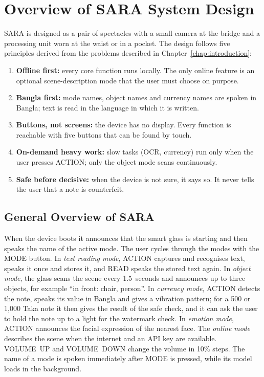 \section{Overview of SARA System Design}
\label{sec:overview}

SARA is designed as a pair of spectacles with a small camera at the bridge and a processing unit worn at the waist or in a pocket. The design follows five principles derived from the problems described in Chapter~\ref{chap:introduction}:

\begin{enumerate}[noitemsep]
    \item \textbf{Offline first:} every core function runs locally. The only online feature is an optional scene-description mode that the user must choose on purpose.
    \item \textbf{Bangla first:} mode names, object names and currency names are spoken in Bangla; text is read in the language in which it is written.
    \item \textbf{Buttons, not screens:} the device has no display. Every function is reachable with five buttons that can be found by touch.
    \item \textbf{On-demand heavy work:} slow tasks (OCR, currency) run only when the user presses ACTION; only the object mode scans continuously.
    \item \textbf{Safe before decisive:} when the device is not sure, it says so. It never tells the user that a note is counterfeit.
\end{enumerate}

\subsection{General Overview of SARA}
When the device boots it announces that the smart glass is starting and then speaks the name of the active mode. The user cycles through the modes with the MODE button. In \textit{text reading mode}, ACTION captures and recognises text, speaks it once and stores it, and READ speaks the stored text again. In \textit{object mode}, the glass scans the scene every 1.5~seconds and announces up to three objects, for example ``in front: chair, person''. In \textit{currency mode}, ACTION detects the note, speaks its value in Bangla and gives a vibration pattern; for a 500 or 1,000 Taka note it then gives the result of the safe check, and it can ask the user to hold the note up to a light for the watermark check. In \textit{emotion mode}, ACTION announces the facial expression of the nearest face. The \textit{online mode} describes the scene when the internet and an API key are available. VOLUME~UP and VOLUME~DOWN change the volume in 10\% steps. The name of a mode is spoken immediately after MODE is pressed, while its model loads in the background.

